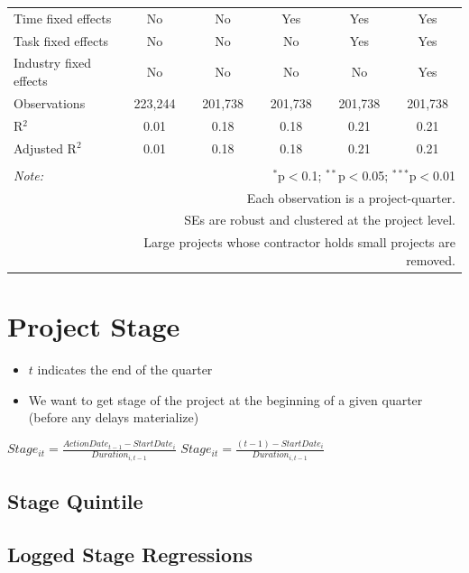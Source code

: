 \documentclass[
]{article}
\providecommand{\tightlist}{%
  \setlength{\itemsep}{0pt}\setlength{\parskip}{0pt}}
\begin{document}
\begin{table}[H]
\begin{tabular}{@{\extracolsep{-2pt}}lccccc}
Time fixed effects & No & No & Yes & Yes & Yes \\ 
Task fixed effects & No & No & No & Yes & Yes \\ 
Industry fixed effects & No & No & No & No & Yes \\ 
Observations & 223,244 & 201,738 & 201,738 & 201,738 & 201,738 \\ 
R$^{2}$ & 0.01 & 0.18 & 0.18 & 0.21 & 0.21 \\ 
Adjusted R$^{2}$ & 0.01 & 0.18 & 0.18 & 0.21 & 0.21 \\ 
\hline 
\hline \\[-1.8ex] 
\textit{Note:}  & \multicolumn{5}{r}{$^{*}$p$<$0.1; $^{**}$p$<$0.05; $^{***}$p$<$0.01} \\ 
 & \multicolumn{5}{r}{Each observation is a project-quarter.} \\ 
 & \multicolumn{5}{r}{SEs are robust and clustered at the project level.} \\ 
 & \multicolumn{5}{r}{Large projects whose contractor holds small projects are removed.} \\ 
\end{tabular} 
\end{table}

\hypertarget{project-stage}{%
\section{Project Stage}\label{project-stage}}

\begin{itemize}
\tightlist
\item
  \(t\) indicates the end of the quarter
\item
  We want to get stage of the project at the beginning of a given
  quarter (before any delays materialize)
\end{itemize}

\(Stage_{it}=\frac{ActionDate_{t-1}-StartDate_i}{Duration_{i,t-1}}\)
\(Stage_{it}=\frac{(t-1)-StartDate_i}{Duration_{i,t-1}}\)

\hypertarget{stage-quintile}{%
\subsection{Stage Quintile}\label{stage-quintile}}

\hypertarget{logged-stage-regressions}{%
\subsection{Logged Stage Regressions}\label{logged-stage-regressions}}
\end{document}
